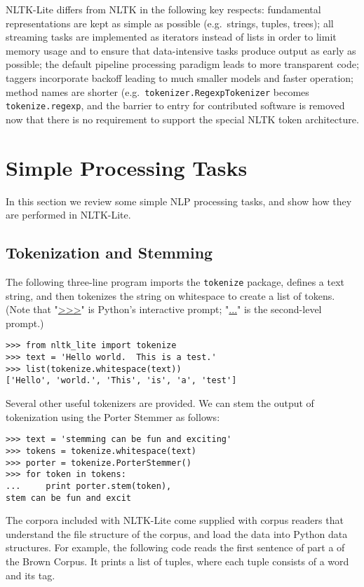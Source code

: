 \documentclass[11pt]{article}
\begin{document}
NLTK-Lite differs from NLTK in the following key respects: fundamental
representations are kept as simple as possible (e.g.\ strings, tuples,
trees); all streaming tasks are implemented as iterators instead of
lists in order to limit memory usage and to ensure that
data-intensive tasks produce output as early as possible; the default
pipeline processing paradigm leads to more transparent code; taggers
incorporate backoff leading to much smaller models and faster
operation; method names are shorter (e.g.\
\texttt{tokenizer.RegexpTokenizer} becomes \texttt{tokenize.regexp},
and the barrier to entry for contributed software is removed now that
there is no requirement to support the special NLTK token
architecture.

\section{Simple Processing Tasks}

In this section we review some simple NLP processing tasks, and show how
they are performed in NLTK-Lite.

\subsection{Tokenization and Stemming}

The following three-line program imports the \texttt{tokenize}
package, defines a text string, and then tokenizes the string on
whitespace to create a list of tokens.  (Note that "\url{>>>}" is
Python's interactive prompt; "\url{...}" is the second-level prompt.)

{\small\begin{verbatim}
>>> from nltk_lite import tokenize
>>> text = 'Hello world.  This is a test.'
>>> list(tokenize.whitespace(text))
['Hello', 'world.', 'This', 'is', 'a', 'test']
\end{verbatim}}

\noindent
Several other useful tokenizers are provided.  We can stem the output of tokenization
using the Porter Stemmer as follows:

{\small\begin{verbatim}
>>> text = 'stemming can be fun and exciting'
>>> tokens = tokenize.whitespace(text)
>>> porter = tokenize.PorterStemmer()
>>> for token in tokens:
...     print porter.stem(token),
stem can be fun and excit
\end{verbatim}}

The corpora included with NLTK-Lite come supplied with corpus readers that understand
the file structure of the corpus, and load the data into Python data structures.
For example, the following code reads the first sentence of part a of the Brown Corpus.
It prints a list of tuples, where each tuple consists of a word and its tag.
\end{document}
